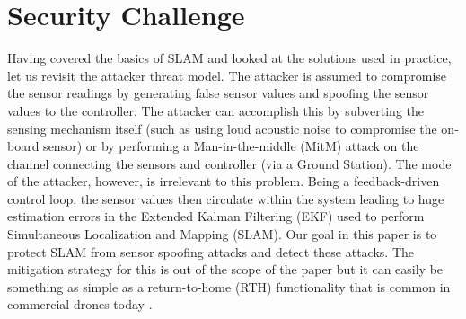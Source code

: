 \section{Security Challenge} Having covered the basics of SLAM and looked at the solutions used in practice, let us revisit the attacker threat model. The attacker is assumed to compromise the sensor readings by generating false sensor values and spoofing the sensor values to the controller. The attacker can accomplish this by subverting the sensing mechanism itself (such as using loud acoustic noise to compromise the on-board sensor) or by performing a Man-in-the-middle (MitM) attack on the channel connecting the sensors and controller (via a Ground Station).  The mode of the attacker, however, is irrelevant to this problem. Being a feedback-driven control loop, the sensor values then circulate within the system leading to huge estimation errors in the Extended Kalman Filtering (EKF) used to perform Simultaneous Localization and Mapping (SLAM). Our goal in this paper is to protect SLAM from sensor spoofing attacks and detect these attacks. The mitigation strategy for this is out of the scope of the paper but it can easily be something as simple as a return-to-home (RTH) functionality that is common in commercial drones today \cite{parrot_blog_2018}.